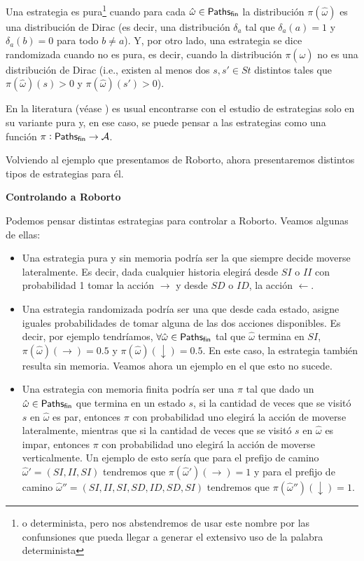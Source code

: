 Una estrategia es pura\footnote{o determinista, pero nos abstendremos de usar
	este nombre por las confunsiones que pueda llegar a generar el extensivo uso de
	la palabra determinista} cuando para cada $\hat \omega \in \textsf{Paths}_\textsf{fin}$ la
distribución $\pi(\hat \omega)$ es una distribución de Dirac (es decir, una
distribución $\delta_a$ tal que $\delta_a(a) = 1$ y $\delta_a(b) = 0$ para todo
$b \neq a$). Y, por otro lado, una estrategia se dice randomizada cuando no es
pura, es decir, cuando la distribución $\pi(\hat \omega)$ no es una
distribución de Dirac (i.e., existen al menos dos $s, s' \in St$ distintos
tales que $\pi(\hat \omega)(s) > 0$ y $\pi(\hat \omega)(s') > 0$).

En la literatura (véase \cite{BaierKatoen, AlfaroThesis}) es usual encontrarse
con el estudio de estrategias solo en su variante pura y, en ese caso, se puede
pensar a las estrategias como una función $\pi: \textsf{Paths}_\textsf{fin} \rightarrow \mathcal{A}$.

Volviendo al ejemplo que presentamos de Roborto, ahora presentaremos distintos
tipos de estrategias para él.

\textbf{Controlando a Roborto}

Podemos pensar distintas estrategias para controlar a Roborto. Veamos algunas
de ellas:

\begin{itemize}
	\item Una estrategia pura y sin memoria podría ser la que siempre decide moverse
	      lateralmente. Es decir, dada cualquier historia elegirá desde $SI$ o $II$ con
	      probabilidad 1 tomar la acción $\rightarrow$ y desde $SD$ o $ID$, la acción
	      $\leftarrow$.
	\item Una estrategia randomizada podría ser una que desde cada estado, asigne iguales
	      probabilidades de tomar alguna de las dos acciones disponibles. Es decir, por
	      ejemplo tendríamos, $\forall \hat \omega \in \textsf{Paths}_\textsf{fin}$ tal que $\hat \omega$
	      termina en $SI$, $\pi(\hat \omega)(\rightarrow) = 0.5$ y $\pi(\hat
		      \omega)(\downarrow) = 0.5$.
	      En este caso, la estrategia también resulta sin memoria. Veamos ahora un
	      ejemplo en el que esto no sucede.
	\item Una estrategia con memoria finita podría ser una $\pi$ tal que dado un $\hat
		      \omega \in \textsf{Paths}_\textsf{fin}$ que termina en un estado $s$, si la cantidad de veces que
	      se visitó $s$ en $\hat \omega$ es par, entonces $\pi$ con probabilidad uno
	      elegirá la acción de moverse lateralmente, mientras que si la cantidad de veces
	      que se visitó $s$ en $\hat \omega$ es impar, entonces $\pi$ con probabilidad
	      uno elegirá la acción de moverse verticalmente. Un ejemplo de esto sería que
	      para el prefijo de camino $\hat \omega' = (SI, II, SI)$ tendremos que $\pi(\hat
		      \omega')(\rightarrow) = 1$ y para el prefijo de camino $\hat \omega''=(SI, II,
		      SI, SD, ID, SD, SI)$ tendremos que $\pi(\hat \omega'')(\downarrow) = 1$.
\end{itemize}

